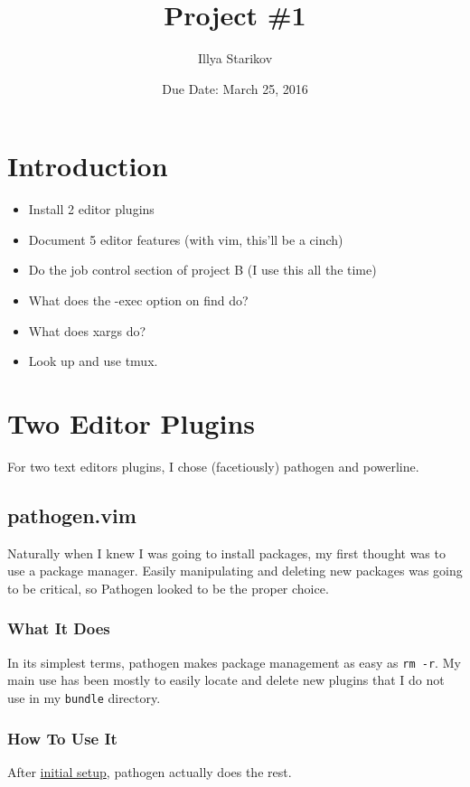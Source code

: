 \documentclass{article}
\title{Project \#1}
\author{Illya Starikov}
\date{Due Date: March 25, 2016}
\newcommand{\shellcmd}[1]{\texttt{\colorbox{gray!30}{#1}}}
\begin{document}
\maketitle

\setcounter{section}{-1}

\section{Introduction}
\begin{itemize}
    \item Install 2 editor plugins
    \item Document 5 editor features (with vim, this'll be a cinch)
    \item Do the job control section of project B (I use this all the time)
    \item What does the -exec option on find do?
    \item What does xargs do?
    \item Look up and use tmux.
\end{itemize}

\section{Two Editor Plugins}
For two text editors plugins, I chose (facetiously) pathogen and powerline.

\subsection{pathogen.vim}
Naturally when I knew I was going to install packages, my first thought was to use a package manager. Easily manipulating and deleting new packages was going to be critical, so Pathogen looked to be the proper choice.

\subsubsection{What It Does}
In its simplest terms, pathogen makes package management as easy as \shellcmd{rm -r}. My main use has been mostly to easily locate and delete new plugins that I do not use in my \texttt{bundle} directory.

\subsubsection{How To Use It}
After \href{https://github.com/tpope/vim-pathogen#runtime-path-manipulation}{initial setup}, pathogen actually does the rest.
\end{document}
